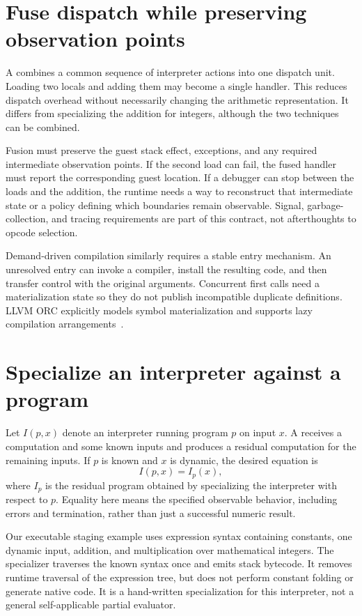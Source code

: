 \section{Fuse dispatch while preserving observation points}
\label{sec:ch65-superinstructions}

A  combines a common sequence of interpreter actions into one dispatch unit.
Loading two locals and adding them may become a single handler.
This reduces dispatch overhead without necessarily changing the arithmetic representation.
It differs from specializing the addition for integers, although the two techniques can be combined.

Fusion must preserve the guest stack effect, exceptions, and any required intermediate observation points.
If the second load can fail, the fused handler must report the corresponding guest location.
If a debugger can stop between the loads and the addition, the runtime needs a way to reconstruct that intermediate state or a policy defining which boundaries remain observable.
Signal, garbage-collection, and tracing requirements are part of this contract, not afterthoughts to opcode selection.

Demand-driven compilation similarly requires a stable entry mechanism.
An unresolved entry can invoke a compiler, install the resulting code, and then transfer control with the original arguments.
Concurrent first calls need a materialization state so they do not publish incompatible duplicate definitions.
LLVM ORC explicitly models symbol materialization and supports lazy compilation arrangements~\cite{llvm-2026-orc}.

\section{Specialize an interpreter against a program}
\label{sec:ch65-staging}

Let $I(p,x)$ denote an interpreter running program $p$ on input $x$.
A  receives a computation and some known inputs and produces a residual computation for the remaining inputs.
If $p$ is known and $x$ is dynamic, the desired equation is
\[
I(p,x)=I_p(x),
\]
where $I_p$ is the residual program obtained by specializing the interpreter with respect to $p$.
Equality here means the specified observable behavior, including errors and termination, rather than just a successful numeric result.

Our executable staging example uses expression syntax containing constants, one dynamic input, addition, and multiplication over mathematical integers.
The specializer traverses the known syntax once and emits stack bytecode.
It removes runtime traversal of the expression tree, but does not perform constant folding or generate native code.
It is a hand-written specialization for this interpreter, not a general self-applicable partial evaluator.

